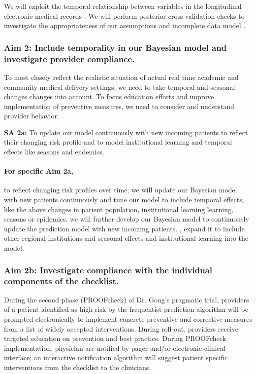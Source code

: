 \documentclass[11pt,notitlepage]{article}
\begin{document}
We will exploit the temporal relationship between variables in the longitudinal electronic medical records \cite{Welch24782349}. We will perform posterior cross validation checks to investigate the appropriateness of our assumptions and incomplete data model \cite{Gelman1998notasked}.

\subsubsection*{Aim 2: Include temporality in our Bayesian model and investigate provider compliance.}
To most closely reflect the realistic situation of actual real time academic and community medical delivery settings, we need to take temporal and seasonal changes changes into account. To focus education efforts and improve implementation of preventive measures, we need to consider and understand provider behavior. 

\textbf{SA 2a:} To update our model continuously with new incoming patients to reflect their changing risk profile and to model institutional learning and temporal effects like seasons and endemics. 

\paragraph*{For specific Aim 2a,} to reflect changing risk profiles over time, we will update our Bayesian model with new patients continuously and tune our model to include temporal effects, like the above changes in patient population, institutional learning learning, seasons or epidemics. we will further develop our Bayesian model to continuously update the prediction model with new incoming patients. , expand it to include other regional institutions and seasonal effects and institutional learning into the model.


\subsubsection*{Aim 2b: Investigate compliance with the individual components of the checklist.}
During the second phase (PROOFcheck) of Dr. Gong's pragmatic trial, providers of a patient identified as high risk by the frequentist prediction algorithm will be prompted electronically to implement concrete preventive and corrective measures from a list of widely accepted interventions. During roll-out, providers receive targeted education on prevention and best practice. During PROOFcheck implementation, physician are notified by pager and/or electronic clinical interface; an interactive notification algorithm will suggest patient specific interventions from the checklist to the clinicians.  
\end{document}
